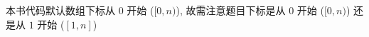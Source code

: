 本书代码默认数组下标从 \(0\) 开始 (\([0, n)\)), 故需注意题目下标是从 \(0\) 开始 (\([0, n)\)) 还是从 \(1\) 开始 (\([1, n]\))

\inputminted[firstline=2]{cpp}{src/_colophon/main.cpp}

\inputminted[firstline=2]{cpp}{src/_colophon/test.cpp}

\inputminted{yaml}{src/_colophon/.clang-format}

\inputminted{bash}{src/_colophon/run.sh}
